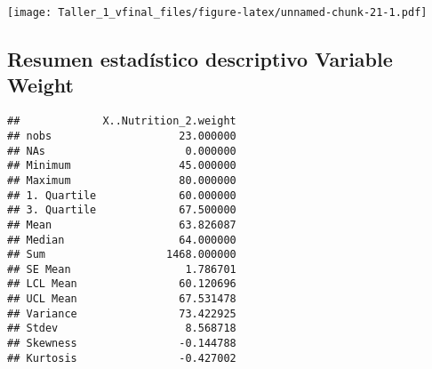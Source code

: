 \documentclass[
]{article}
\newenvironment{Shaded}{\begin{snugshade}}{\end{snugshade}}
\newcommand{\AttributeTok}[1]{\textcolor[rgb]{0.77,0.63,0.00}{#1}}
\newcommand{\DecValTok}[1]{\textcolor[rgb]{0.00,0.00,0.81}{#1}}
\newcommand{\FloatTok}[1]{\textcolor[rgb]{0.00,0.00,0.81}{#1}}
\newcommand{\FunctionTok}[1]{\textcolor[rgb]{0.00,0.00,0.00}{#1}}
\newcommand{\NormalTok}[1]{#1}
\newcommand{\OtherTok}[1]{\textcolor[rgb]{0.56,0.35,0.01}{#1}}
\newcommand{\SpecialCharTok}[1]{\textcolor[rgb]{0.00,0.00,0.00}{#1}}
\newcommand{\StringTok}[1]{\textcolor[rgb]{0.31,0.60,0.02}{#1}}
\begin{document}
\texttt{[image: Taller\_1\_vfinal\_files/figure-latex/unnamed-chunk-21-1.pdf]}

\hypertarget{resumen-estaduxedstico-descriptivo-variable-weight}{%
\subsection{\texorpdfstring{Resumen estadístico descriptivo Variable
\textbf{Weight}}{Resumen estadístico descriptivo Variable Weight}}\label{resumen-estaduxedstico-descriptivo-variable-weight}}

\begin{Shaded}
\end{Shaded}

\begin{verbatim}
##             X..Nutrition_2.weight
## nobs                    23.000000
## NAs                      0.000000
## Minimum                 45.000000
## Maximum                 80.000000
## 1. Quartile             60.000000
## 3. Quartile             67.500000
## Mean                    63.826087
## Median                  64.000000
## Sum                   1468.000000
## SE Mean                  1.786701
## LCL Mean                60.120696
## UCL Mean                67.531478
## Variance                73.422925
## Stdev                    8.568718
## Skewness                -0.144788
## Kurtosis                -0.427002
\end{verbatim}

\begin{Shaded}
\end{Shaded}
\end{document}
